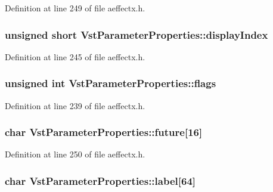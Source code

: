 Definition at line 249 of file aeffectx.\+h.

\subsubsection[{\texorpdfstring{display\+Index}{displayIndex}}]{\setlength{\rightskip}{0pt plus 5cm}unsigned short Vst\+Parameter\+Properties\+::display\+Index}\hypertarget{class_vst_parameter_properties_a02fc8be0fb121711eff2253f603bf088}{}\label{class_vst_parameter_properties_a02fc8be0fb121711eff2253f603bf088}


Definition at line 245 of file aeffectx.\+h.

\subsubsection[{\texorpdfstring{flags}{flags}}]{\setlength{\rightskip}{0pt plus 5cm}unsigned {\bf int} Vst\+Parameter\+Properties\+::flags}\hypertarget{class_vst_parameter_properties_a725356e340e6003a3d0d4c334661d946}{}\label{class_vst_parameter_properties_a725356e340e6003a3d0d4c334661d946}


Definition at line 239 of file aeffectx.\+h.

\subsubsection[{\texorpdfstring{future}{future}}]{\setlength{\rightskip}{0pt plus 5cm}char Vst\+Parameter\+Properties\+::future\mbox{[}16\mbox{]}}\hypertarget{class_vst_parameter_properties_af987f30d8b06ab3bd25bc3c8a20f9f96}{}\label{class_vst_parameter_properties_af987f30d8b06ab3bd25bc3c8a20f9f96}


Definition at line 250 of file aeffectx.\+h.

\subsubsection[{\texorpdfstring{label}{label}}]{\setlength{\rightskip}{0pt plus 5cm}char Vst\+Parameter\+Properties\+::label\mbox{[}64\mbox{]}}\hypertarget{class_vst_parameter_properties_a3b0ff07ceb59630d174218b8a0f04ab9}{}\label{class_vst_parameter_properties_a3b0ff07ceb59630d174218b8a0f04ab9}


